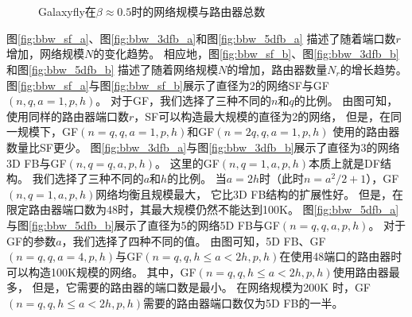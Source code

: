 \begin{figure}[t]
  \centering
  \begin{minipage}[t]{\textwidth}
    \centering
    \\
    \\
    \caption{Galaxyfly在$\beta \approx 0.5$时的网络规模与路由器总数}
    \label{chap03figure6}
  \end{minipage}
\end{figure}

图\ref{fig:bbw_sf_a}、图\ref{fig:bbw_3dfb_a}和图\ref{fig:bbw_5dfb_a}
描述了随着端口数$r$增加，网络规模$N$的变化趋势。
相应地，图\ref{fig:bbw_sf_b}、图\ref{fig:bbw_3dfb_b}和图\ref{fig:bbw_5dfb_b}
描述了随着网络规模$N$的增加，路由器数量$N_r$的增长趋势。
图\ref{fig:bbw_sf_a}与图\ref{fig:bbw_sf_b}展示了直径为2的网络SF与GF$(n,q,a=1,p,h)$。
对于GF，我们选择了三种不同的$n$和$q$的比例。
由图可知，使用同样的路由器端口数$r$，SF可以构造最大规模的直径为2的网络，
但是，在同一规模下，GF$(n=q,q,a=1,p,h)$和GF$(n=2q,q,a=1,p,h)$
使用的路由器数量比SF更少。
图\ref{fig:bbw_3dfb_a}与图\ref{fig:bbw_3dfb_b}展示了直径为3的网络3D FB与GF$(n,q=q,a,p,h)$。
这里的GF$(n,q=1,a,p,h)$本质上就是DF结构。
我们选择了三种不同的$a$和$h$的比例。
当$a=2h$时（此时$n=a^{2}/2+1$），GF$(n,q=1,a,p,h)$网络均衡且规模最大，
它比3D FB结构的扩展性好。
但是，在限定路由器端口数为48时，其最大规模仍然不能达到100K。
图\ref{fig:bbw_5dfb_a}与图\ref{fig:bbw_5dfb_b}展示了直径为5的网络5D FB与GF$(n=q,q,a,p,h)$。
对于GF的参数$a$，我们选择了四种不同的值。
由图可知，5D FB、GF$(n=q,q,a=4,p,h)$与GF$(n=q,q,h\leq{}a<2h,p,h)$在使用48端口的路由器时
可以构造100K规模的网络。
其中，GF$(n=q,q,h\leq{}a<2h,p,h)$使用路由器最多，
但是，它需要的路由器的端口数是最小。
在网络规模为200K 时，GF$(n=q,q,h\leq{}a<2h,p,h)$需要的路由器端口数仅为5D FB的一半。

